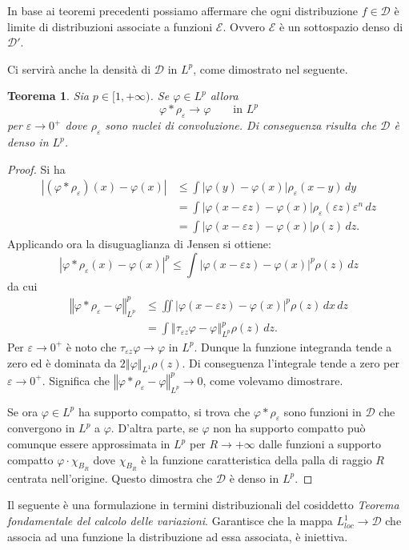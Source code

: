 \documentclass[italian,a4paper,oneside,headinclude]{scrbook}
\newcommand{\eps}{\varepsilon}
\renewcommand{\phi}{\varphi}
\newcommand{\loc}{\mathit{loc}}
\newcommand{\D}{\mathcal D}
\newcommand{\E}{\mathcal E}
\newcommand{\abs}[1]{{\left|#1\right|}}
\newcommand{\Abs}[1]{{\left\Vert #1\right\Vert}}
\newtheorem{theorem}{Teorema}
\begin{document}
In base ai teoremi precedenti possiamo affermare che ogni
distribuzione $f\in \D$ è limite di distribuzioni associate a funzioni
$\E$. Ovvero $\E$ è un sottospazio denso di $\D'$.

Ci servirà anche la densità di $\D$ in $L^p$, come dimostrato nel
seguente.
\begin{theorem}\label{th:DdenseL1}
  Sia $p\in [1,+\infty)$.
  Se $\phi\in L^p$ allora
  \[
  \phi*\rho_\eps \to \phi \qquad\text{in $L^p$}
  \]
  per $\eps \to 0^+$ dove $\rho_\eps$ sono nuclei di convoluzione.
  Di conseguenza risulta che $\D$ è denso in $L^p$.
\end{theorem}
%
\begin{proof}
  Si ha
  \begin{align*}
    \abs{(\phi * \rho_\eps)(x)-\phi(x)}
    &\le \int \abs{\phi(y)-\phi(x)} \rho_\eps(x-y)\, dy\\
    &= \int \abs{\phi(x-\eps z) - \phi(x)} \rho_\eps(\eps z) \eps^n
    \, dz\\
    &= \int \abs{\phi(x-\eps z) - \phi(x)}\rho(z)\, dz.
  \end{align*}
  Applicando ora la disuguaglianza di Jensen si ottiene:
  \[
  \abs{\phi*\rho_\eps(x)-\phi(x)}^p \le \int \abs{\phi(x-\eps z) - \phi(x)}^p \rho(z)\, dz
  \]
  da cui
  \begin{align*}
    \Abs{\phi * \rho_\eps - \phi}_{L^p}^p
    &\le \iint \abs{\phi(x-\eps z) - \phi(x)}^p \rho(z) \, dx\, dz\\
    &= \int \Abs{\tau_{\eps z} \phi -\phi}_{L^p}^p \rho(z)\, dz.
  \end{align*}
  Per $\eps\to 0^+$ è noto che $\tau_{\eps z} \phi \to \phi$ in
  $L^p$.
  Dunque la funzione integranda tende a zero ed è dominata da
  $2\Abs{\phi}_{L^1} \rho(z)$.
  Di conseguenza l'integrale tende a zero per $\eps\to 0^+$.
  Significa che $\Abs{\phi*\rho_\eps - \phi}_{L^p}^p \to 0$, come
  volevamo dimostrare.

  Se ora $\phi\in L^p$ ha supporto compatto, si trova che
  $\phi * \rho_\eps$ sono funzioni in $\D$ che convergono in $L^p$ a
  $\phi$. D'altra parte, se $\phi$ non ha supporto compatto può
  comunque essere approssimata in $L^p$ per $R\to +\infty$
  dalle funzioni a supporto compatto
  $\phi\cdot\chi_{B_R}$ dove $\chi_{B_R}$ è la funzione caratteristica
  della palla di raggio $R$ centrata nell'origine. Questo dimostra che
  $\D$ è denso in $L^p$.
\end{proof}

Il seguente è una formulazione in termini distribuzionali del
cosiddetto \emph{Teorema fondamentale del calcolo delle variazioni}.
Garantisce che la mappa
$L^1_\loc \to \D$ che associa ad una funzione la distribuzione ad essa
associata, è iniettiva.
\end{document}
